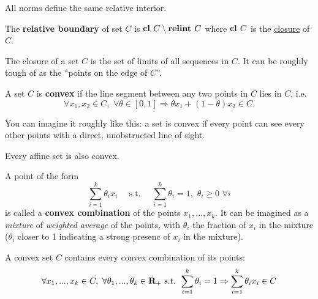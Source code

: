 \begin{Fact}
  All norms define the same relative interior.
\end{Fact}

\begin{Definition}
  The \textbf{relative boundary} of set $C$ is $\textbf{cl }C \setminus \textbf{relint }C$
  where $\textbf{cl }C$ is the \href{https://en.wikipedia.org/wiki/Closure_(mathematics)}{closure} of $C$.
\end{Definition}

\begin{Fact}
  The closure of a set $C$ is the set of limits of all sequences in $C$. It can
  be roughly tough of as the ``points on the edge of $C$''.
\end{Fact}


\begin{Definition}
  A set $C$ is \textbf{convex} if the line segment between any two points in $C$
  lies in $C$, i.e.
  \begin{equation}
    \label{eq:convex_set_definition}
    \forall x_1, x_2\in C,\,\,\forall \theta\in [0,1]\Rightarrow\theta
    x_1+(1-\theta)x_2\in C.
  \end{equation}
\end{Definition}

You can imagine it roughly like this: a set is convex if every point can see
every other points with a direct, unobstructed line of sight.


\begin{Fact}
  Every affine set is also convex. 
\end{Fact}

\begin{Definition}
  A point of the form
  \begin{equation*}
    \sum_{i=1}^k\theta_ix_i\quad\text{ s.t. }\quad\sum_{i=1}^k\theta_i =
    1,\,\,\theta_i\ge 0\,\,\forall i
  \end{equation*}
  is called a \textbf{convex combination} of the points $x_1,...,x_k$. It can be
  imagined as a \textit{mixture} of \textit{weighted average} of the points,
  with $\theta_i$ the fraction of $x_i$ in the mixture ($\theta_i$ closer to 1
  indicating a strong presenc of $x_i$ in the mixture).
\end{Definition}
\begin{Fact}
  A convex set $C$ contains every convex combination of its points:
  \begin{equation*}
    \forall x_1,...,x_k\in C,\,\,\forall \theta_1,...,\theta_k\in\textbf{R}_+\text{
      s.t. }\sum_{i=1}^k\theta_i=1\Rightarrow \sum_{i=1}^k\theta_ix_i \in C
  \end{equation*}
\end{Fact}

